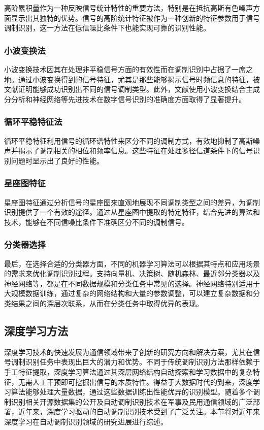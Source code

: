 高阶累积量作为一种反映信号统计特性的重要方法，特别是在抵抗高斯有色噪声方面显示出其独特的优势。信号的高阶统计特征被作为一种创新的特征参数用于信号调制识别，这一方法在低信噪比条件下也能实现可靠的识别性能。

\subsubsection{小波变换法}
小波变换技术因其在处理非平稳信号方面的有效性而在调制识别中占据了一席之地。通过小波变换得到的信号特征，尤其是那些能够揭示信号时频信息的特征，被文献\cite{刘明骞2018认知无线电}证明能够成功识别出不同的信号调制类型。此外，文献\cite{li2019wavelet}使用小波变换结合主成分分析和神经网络等先进技术在数字信号识别的准确度方面取得了显著提升。

\subsubsection{循环平稳特征法}
循环平稳特征利用信号的循环谱特性来区分不同的调制方式，有效地抑制了高斯噪声并揭示了调制相关的相位和频率信息。这些特征在处理多径信道条件下的信号识别问题时显示出了良好的性能。

\subsubsection{星座图特征}
星座图特征通过分析信号的星座图来直观地展现不同调制类型之间的差异，为调制识别提供了一个有效的途径。通过从星座图中提取的特定特征，结合先进的算法和技术，能够在不同信噪比条件下准确区分不同的调制信号。

\subsubsection{分类器选择}
最后，在选择合适的分类器方面，不同的机器学习算法可以根据其特点和应用场景的需求来优化调制识别过程。支持向量机、决策树、随机森林、最近邻分类器以及神经网络等，都是在不同数据规模和分类任务中常见的选择。神经网络特别适用于大规模数据训练，通过复杂的网络结构和大量的参数调整，可以建立复杂数据和分类结果之间的深层次联系，从而在分类任务中取得优异的表现。

\subsection{深度学习方法}
深度学习技术的快速发展为通信领域带来了创新的研究方向和解决方案，尤其在信号调制识别任务中表现出巨大的潜力和优势。不同于传统调制识别方法那样依赖于手工特征提取，深度学习算法通过其深层网络结构自动探索和学习数据中的复杂特征，无需人工干预即可挖掘出信号的本质特性。得益于大数据时代的到来，深度学习算法能够处理大量数据，通过这些数据训练出性能优异的识别模型。随着多个调制识别相关开源数据集的公开\cite{o2016convolutional}\cite{o2018over}及自动调制识别技术在军事及民用通信领域的广泛部署，近年来，深度学习驱动的自动调制识别技术受到了广泛关注。本节将对近年来深度学习在自动调制识别领域的研究进展进行综述。

